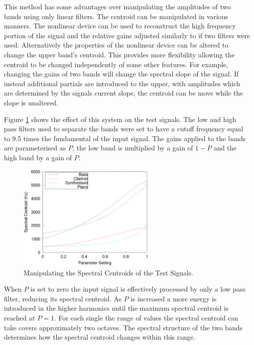 			This method has some advantages over manipulating the amplitudes of two bands using only linear
			filters. The centroid can be manipulated in various manners. The nonlinear device can be used to
			reconstruct the high frequency portion of the signal and the relative gains adjusted similarly to
			if two filters were used.  Alternatively the properties of the nonlinear device can be altered to
			change the upper band's centroid. This provides more flexibility allowing the centroid to be
			changed independently of some other features. For example, changing the gains of two bands will
			change the spectral slope of the signal. If instead additional partials are introduced to the
			upper, with amplitudes which are determined by the signals current slope, the centroid can be move
			while the slope is unaltered.

			Figure \ref{fig:MoveCentroids} shows the effect of this system on the test signals. The low and
			high pass filters used to separate the bands were set to have a cutoff frequency equal to 9.5 times
			the fundamental of the input signal. The gains applied to the bands are parameterised as $P$, the
			low band is multiplied by a gain of $1 - P$ and the high band by a gain of $P$.

			\begin{figure}[h!]
				\centering
				\includegraphics[width=0.6\textwidth]{chapter6/Images/MoveCentroids.eps}
				\caption{Manipulating the Spectral Centroids of the Test Signals.}
				\label{fig:MoveCentroids}
			\end{figure}

			When $P$ is set to zero the input signal is effectively processed by only a low pass filter,
			reducing its spectral centroid. As $P$ is increased a more energy is introduced in the higher
			harmonics until the maximum spectral centroid is reached at $P = 1$. For each single the range of
			values the spectral centroid can take covers approximately two octaves. The spectral structure of
			the two bands determines how the spectral centroid changes within this range.

